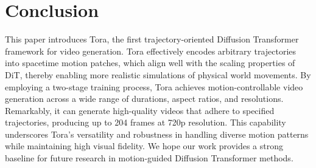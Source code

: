 \section{Conclusion}
This paper introduces Tora, the first trajectory-oriented Diffusion Transformer framework for video generation. 
Tora effectively encodes arbitrary trajectories into spacetime motion patches, which align well with the scaling properties of DiT, thereby enabling more realistic simulations of physical world movements. By employing a two-stage training process, Tora achieves motion-controllable video generation across a wide range of durations, aspect ratios, and resolutions. Remarkably, it can generate high-quality videos that adhere to specified trajectories, producing up to 204 frames at 720p resolution. This capability underscores Tora's versatility and robustness in handling diverse motion patterns while maintaining high visual fidelity. We hope our work provides a strong baseline for future research in motion-guided Diffusion Transformer methods.

